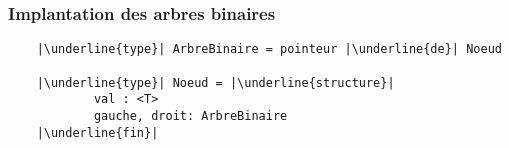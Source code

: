 \documentclass[table,handout,tikz,12pt,svgnames]{beamer}
\begin{document}
\begin{frame}[fragile=singleslide]
	\frametitle{Implantation des arbres binaires}
	\begin{verbatim}
	|\underline{type}| ArbreBinaire = pointeur |\underline{de}| Noeud

	|\underline{type}| Noeud = |\underline{structure}|
			val : <T>
			gauche, droit: ArbreBinaire
	|\underline{fin}|
	\end{verbatim}
%
\end{frame}
\end{document}
